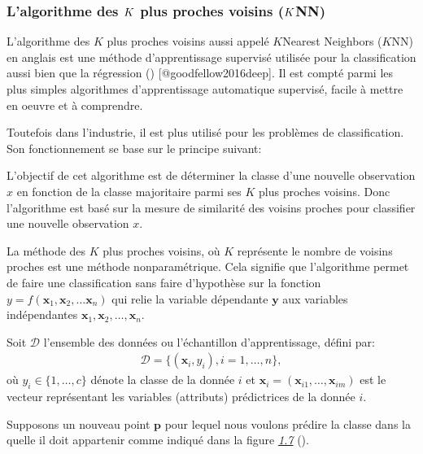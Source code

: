 \documentclass[letterpaper,11pt,english]{sphinxmanual}
\begin{document}
\subsubsection{L’algorithme des \protect\(K\protect\) plus proches voisins (\protect\(K\protect\)\sphinxhyphen{}NN)}
\label{\detokenize{chapter3:lalgorithme-des-k-plus-proches-voisins-k-nn}}
\sphinxAtStartPar
L’algorithme des \(K\) plus proches voisins aussi appelé
\(K\)\sphinxhyphen{}Nearest Neighbors (\(K\)\sphinxhyphen{}NN) en anglais est une méthode
d’apprentissage supervisé utilisée pour la classification aussi bien que
la régression () {[}@goodfellow2016deep{]}. Il est
compté parmi les plus simples algorithmes d’apprentissage automatique
supervisé, facile à mettre en oeuvre et à comprendre.

\sphinxAtStartPar
Toutefois dans l’industrie, il est plus utilisé pour les problèmes de
classification. Son fonctionnement se base sur le principe suivant: 

\sphinxAtStartPar
L’objectif de cet algorithme est de déterminer la classe d’une nouvelle
observation \(x\) en fonction de la classe majoritaire parmi ses
\(K\) plus proches voisins. Donc l’algorithme est basé sur la mesure
de similarité des voisins proches pour classifier une nouvelle
observation \(x\).

\sphinxAtStartPar
La méthode des \(K\) plus proches voisins, où \(K\) représente
le nombre de voisins proches est une méthode non\sphinxhyphen{}paramétrique. Cela
signifie que l’algorithme permet de faire une classification sans faire
d’hypothèse sur la fonction
\(y=f(\mathbf{x}_1,\mathbf{x}_2, \dots \mathbf{x}_n)\) qui relie la
variable dépendante \(\mathbf{y}\) aux variables indépendantes
\(\mathbf{x}_1,\mathbf{x}_2, \dots, \mathbf{x}_n\).

\sphinxAtStartPar
Soit \(\mathcal{D}\) l’ensemble des données ou l’échantillon
d’apprentissage, défini par:
\begin{equation}\label{equation:chapter3:chapter3:21}
\begin{split}\mathcal{D}=\{(\mathbf{x}_i, y_i), i=1, \dots, n\},\end{split}
\end{equation}
\sphinxAtStartPar
où \(y_i \in \{1,\dots,c\}\) dénote la classe de la donnée
\(i\) et
\(\mathbf{x}_i=(\mathbf{x}_{i1}, \dots, \mathbf{x}_{im})\) est le
vecteur représentant les variables (attributs) prédictrices de la donnée
\(i\).

\sphinxAtStartPar
Supposons un nouveau point \(\textbf{p}\) pour lequel nous voulons
prédire la classe dans la quelle il doit appartenir comme indiqué dans
la figure {\hyperref[\detokenize{chapter3:fig:Knn}]{\emph{1.7}}} ().
\end{document}
